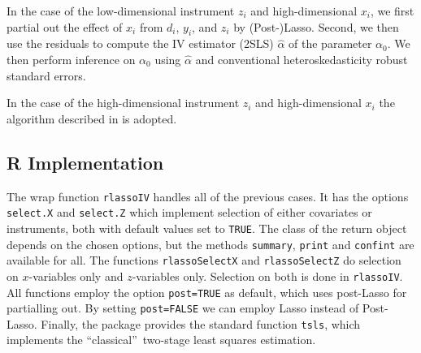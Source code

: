 \documentclass{amsart}\usepackage[]{graphicx}\usepackage[]{color}
\newcommand{\code}[1]{\texttt{#1}}
\begin{document}
In the case of the low-dimensional instrument $z_i$
and high-dimensional $x_i$, we first partial out the effect of $x_i$ from $d_i$, $y_i$, and $z_i$ by (Post-)Lasso. Second, we then use the residuals to compute the IV estimator (2SLS) $\hat \alpha$ of the parameter $\alpha_0$. We then perform inference on $\alpha_0$ using $\hat \alpha$ and conventional heteroskedasticity robust standard errors.

In the case of the high-dimensional instrument $z_i$
and high-dimensional $x_i$ the algorithm described in \citet{CHS:ManyIVNote} is adopted. 




\subsection*{R Implementation}
 The wrap function \code{rlassoIV} handles all of the previous cases. It has the options \code{select.X} and \code{select.Z} which implement selection of either covariates or instruments, both with default values set to \code{TRUE}. The class of the return object depends on the chosen options, but the methods \code{summary}, \code{print} and \code{confint} are available for all. The functions \code{rlassoSelectX} and \code{rlassoSelectZ} do selection on  $x$-variables only and  $z$-variables only. Selection on both is done in \code{rlassoIV}. All functions employ the option \code{post=TRUE} as default, which 
 uses post-Lasso for partialling out.  By setting \code{post=FALSE}
 we can employ Lasso instead of Post-Lasso. Finally, the package provides the standard function \code{tsls}, which implements the \textquotedblleft classical\textquotedblright\ two-stage least squares estimation.
\end{document}
